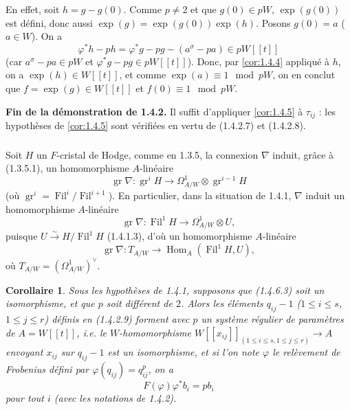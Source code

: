 \documentclass[12pt,a4paper]{article}
\theoremstyle{plain}
\newtheorem{corollary}[theorem]{Corollaire}
\theoremstyle{definition}
\theoremstyle{remark}
\DeclareMathOperator{\Fil}{Fil}
\DeclareMathOperator{\gr}{gr}
\DeclareMathOperator{\Hom}{Hom}
\providecommand{\Hom}{\operatorname{Hom}}
\begin{document}
En effet, soit $h = g - g(0)$. Comme $p \neq 2$ et que $g(0) \in pW$, $\exp(g(0))$ est d\'efini, donc aussi $\exp(g) = \exp(g(0))\exp(h)$. Posons $g(0) = a$ ($a \in W$). On a
\[
\varphi^*h - ph = \varphi^*g - pg - (a^\sigma - pa) \in pW[[t]]
\]
(car $a^\sigma - pa \in pW$ et $\varphi^*g - pg \in pW[[t]]$). Donc, par \ref{cor:1.4.4} appliqu\'e \`a $h$, on a $\exp(h) \in W[[t]]$, et comme $\exp(a) \equiv 1 \mod pW$, on en conclut que $f = \exp(g) \in W[[t]]$ et $f(0) \equiv 1 \mod pW$.

\textbf{Fin de la d\'emonstration de 1.4.2.} Il suffit d'appliquer \ref{cor:1.4.5} \`a $\tau_{ij}$ : les hypoth\`eses de \ref{cor:1.4.5} sont v\'erifi\'ees en vertu de (1.4.2.7) et (1.4.2.8).

\subsubsection{}
Soit $H$ un $F$-cristal de Hodge, comme en 1.3.5, la connexion $\nabla$ induit, gr\^ace \`a (1.3.5.1), un homomorphisme $A$-lin\'eaire
\begin{equation}\tag{1.4.6.1}
\gr\nabla : \gr^i H \longrightarrow \Omega^1_{A/W} \otimes \gr^{i-1} H 
\end{equation}
(o\`u $\gr^i = \Fil^i/\Fil^{i+1}$). En particulier, dans la situation de 1.4.1, $\nabla$ induit un homomorphisme $A$-lin\'eaire
\begin{equation}\tag{1.4.6.2}
\gr\nabla : \Fil^1 H \longrightarrow \Omega^1_{A/W} \otimes U, 
\end{equation}
puisque $U \xrightarrow{\sim} H/\Fil^1 H$ (1.4.1.3), d'o\`u un homomorphisme $A$-lin\'eaire
\begin{equation}\tag{1.4.6.3}
\gr\nabla : T_{A/W} \longrightarrow \Hom_A(\Fil^1 H, U), 
\end{equation}
o\`u $T_{A/W} = (\Omega^1_{A/W})^\vee$.

\begin{corollary}\label{cor:1.4.7}
Sous les hypoth\`eses de 1.4.1, supposons que (1.4.6.3) soit un isomorphisme, et que $p$ soit diff\'erent de $2$. Alors les \'el\'ements $q_{ij} - 1$ ($1 \leqslant i \leqslant s$, $1 \leqslant j \leqslant r$) d\'efinis en (1.4.2.9) forment avec $p$ un syst\`eme r\'egulier de param\`etres de $A = W[[t]]$, i.e. le $W$-homomorphisme $W[[x_{ij}]]_{(1\leqslant i\leqslant s, 1\leqslant j\leqslant r)} \to A$ envoyant $x_{ij}$ sur $q_{ij} - 1$ est un isomorphisme, et si l'on note $\varphi$ le rel\`evement de Frobenius d\'efini par $\varphi(q_{ij}) = q_{ij}^p$, on a
\begin{equation}\tag{1.4.7.1}
F(\varphi)\varphi^*b_i = pb_i 
\end{equation}
pour tout $i$ (avec les notations de 1.4.2).
\end{corollary}
\end{document}
